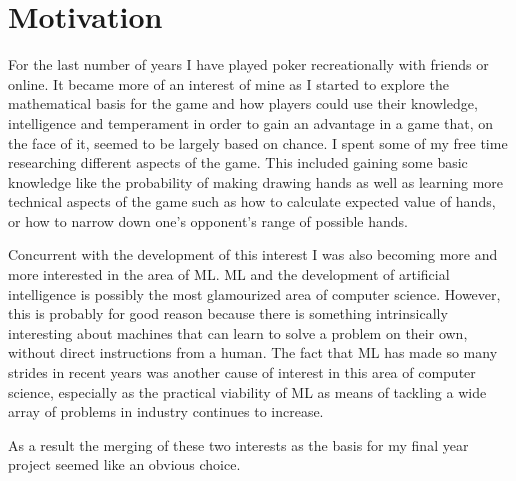 \section{Motivation}\label{sec:Motivation}
For the last number of years I have played poker recreationally with friends or online.
It became more of an interest of mine as I started to explore the mathematical basis for the game and how
players could use their knowledge, intelligence and temperament in order to gain an advantage in a game that,
on the face of it, seemed to be largely based on chance.
I spent some of my free time researching different aspects of the game.
This included gaining some basic knowledge like the probability of making drawing hands as well as learning more
technical aspects of the game such as how to calculate expected value of hands,
or how to narrow down one's opponent's range of possible hands.

Concurrent with the development of this interest I was also becoming more and more interested in the area
of ML.
ML and the development of artificial intelligence is possibly the most glamourized area
of computer science.
However, this is probably for good reason because there is something intrinsically interesting
about machines that can learn to solve a problem on their own, without direct instructions from a human.
The fact that ML has made so many strides in recent years was another cause of interest in
this area of computer science, especially as the practical viability of ML as means of tackling a wide array
of problems in industry continues to increase.

As a result the merging of these two interests as the basis for my final year project seemed like an obvious choice.